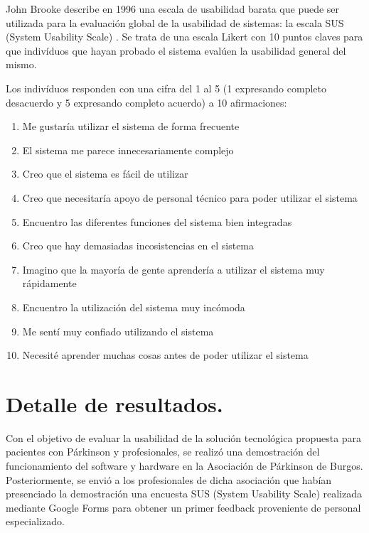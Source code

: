 John Brooke describe en 1996 una escala de usabilidad barata que puede ser utilizada para la evaluación global de la usabilidad de sistemas: la escala SUS (System Usability Scale) \cite{inbook}. Se trata de una escala Likert con 10 puntos claves para que indivíduos que hayan probado el sistema evalúen la usabilidad general del mismo.

Los indivíduos responden con una cifra del 1 al 5 (1 expresando completo desacuerdo y 5 expresando completo acuerdo) a 10 afirmaciones:
\begin{enumerate}
    \item Me gustaría utilizar el sistema de forma frecuente
    \item El sistema me parece innecesariamente complejo
    \item Creo que el sistema es fácil de utilizar
    \item Creo que necesitaría apoyo de personal técnico para poder utilizar el sistema
    \item Encuentro las diferentes funciones del sistema bien integradas
    \item Creo que hay demasiadas incosistencias en el sistema
    \item Imagino que la mayoría de gente aprendería a utilizar el sistema muy rápidamente
    \item Encuentro la utilización del sistema muy incómoda
    \item Me sentí muy confiado utilizando el sistema
    \item Necesité aprender muchas cosas antes de poder utilizar el sistema
\end{enumerate}
\section{Detalle de resultados.}
Con el objetivo de evaluar la usabilidad de la solución tecnológica propuesta para pacientes con Párkinson y profesionales, se realizó una demostración del funcionamiento del software y hardware en la Asociación de Párkinson de Burgos. Posteriormente, se envió a los profesionales de dicha asociación que habían presenciado la demostración una encuesta SUS (System Usability Scale) realizada mediante Google Forms para obtener un primer feedback proveniente de personal especializado.

